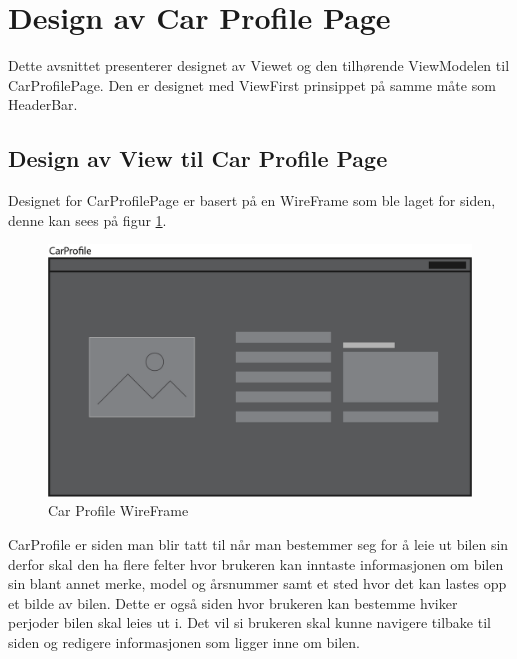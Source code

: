 \documentclass[SoftwareDesign/SoftwareDesign_main.tex]{subfiles}
\begin{document}
\section{Design av Car Profile Page}
Dette avsnittet presenterer designet av Viewet og den tilhørende ViewModelen til CarProfilePage. Den er designet med ViewFirst prinsippet på samme måte som HeaderBar.
\subsection{Design av View til Car Profile Page}
Designet for CarProfilePage er basert på en WireFrame som ble laget for siden, denne kan sees på figur \ref{fig:CarProfileWireFrame}.
\begin{figure}[H]
    \centering
    \includegraphics[width=\textwidth]{SoftwareDesign/MVVMDesigns/Graphics/CarProfileWireFrame.png}
    \caption{Car Profile WireFrame}
    \label{fig:CarProfileWireFrame}
\end{figure}

CarProfile er siden man blir tatt til når man bestemmer seg for å leie ut bilen sin derfor skal den ha flere felter hvor brukeren kan inntaste informasjonen om bilen sin blant annet merke, model og årsnummer samt et sted hvor det kan lastes opp et bilde av bilen. Dette er også siden hvor brukeren kan bestemme hviker perjoder bilen skal leies ut i. Det vil si brukeren skal kunne navigere tilbake til siden og redigere informasjonen som ligger inne om bilen.
\end{document}
